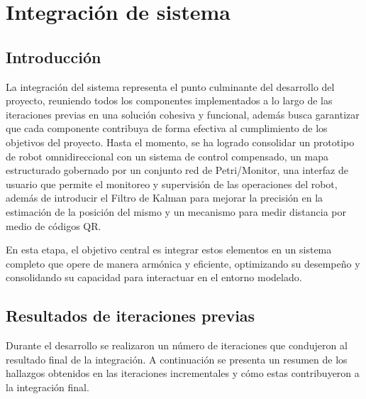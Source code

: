 \newpage
\chapter{Integración de sistema}

\section{Introducción}

La integración del sistema representa el punto culminante del desarrollo del proyecto, reuniendo todos los componentes implementados a lo largo de las iteraciones previas en una solución cohesiva y funcional, además busca garantizar que cada componente contribuya de forma efectiva al cumplimiento de los objetivos del proyecto. Hasta el momento, se ha logrado consolidar un prototipo de robot omnidireccional con un sistema de control compensado, un mapa estructurado gobernado por un conjunto red de Petri/Monitor, una interfaz de usuario que permite el monitoreo y supervisión de las operaciones del robot, además de introducir el Filtro de Kalman para mejorar la precisión en la estimación de la posición del mismo y un mecanismo para medir distancia por medio de códigos QR.

En esta etapa, el objetivo central es integrar estos elementos en un sistema completo que opere de manera armónica y eficiente, optimizando su desempeño y consolidando su capacidad para interactuar en el entorno modelado.

\section{Resultados de iteraciones previas}

Durante el desarrollo se realizaron un número de iteraciones que condujeron al resultado final de la integración. A continuación se presenta un resumen de los hallazgos obtenidos en las iteraciones incrementales y cómo estas contribuyeron a la integración final.


